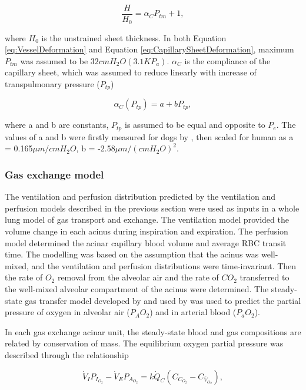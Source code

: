 \begin{equation}
 \label{eq:CapillarySheetDeformation}
 \frac{H}{H_0} = \alpha_C P_{tm} + 1,
\end{equation}

\noindent where $H_0$ is the unstrained sheet thickness. In both Equation \ref{eq:VesselDeformation} and Equation \ref{eq:CapillarySheetDeformation}, maximum $P_{tm}$ was assumed to be $32 cmH_2 O(3.1KP_a)$. $\alpha_C$ is the compliance of the capillary sheet, which was assumed to reduce linearly with increase of transpulmonary pressure ($P_{tp}$)

\begin{equation} 
 \label{eq:CapillaryCompliance}
 \alpha_C(P_{tp}) = a + bP_{tp},
\end{equation}

\noindent where a and b are constants, $P_{tp}$ is assumed to be equal and opposite to $P_e$. The values of a and b were firstly measured for dogs by \cite{glazier1969measurements}, then scaled for human as a = 0.165$\mu m/cmH_2O$, b = -2.58$\mu m/{(cmH_2O)}^2$.

\subsubsection{Gas exchange model}
The ventilation and perfusion distribution predicted by the ventilation and perfusion models described in the previous section were used as inputs in a whole lung model of gas transport and exchange. The ventilation model provided the volume change in each acinus during inspiration and expiration. The perfusion model determined the acinar capillary blood volume and average RBC transit time. The modelling was based on the assumption that the acinus was well-mixed, and the ventilation and perfusion distributions were time-invariant. Then the rate of $O_2$ removal from the alveolar air and the rate of $CO_2$ transferred to the well-mixed alveolar compartment of the acinus were determined. The steady-state gas transfer model developed by \cite{kapitan1986computer} and used by \cite{clark2014lack} was used to predict the partial pressure of oxygen in alveolar air ($P_AO_2$) and in arterial blood ($P_aO_2$).

In each gas exchange acinar unit, the steady-state blood and gas compositions are related by conservation of mass. The equilibrium oxygen partial pressure was described through the relationship

\begin{equation} 
 \label{eq:SteadyStateEquation}
 \dot{V}_I P_{I_{O_2}} - \dot{V}_E P_{A_{O_2}} = k\dot{Q}_C(C_{C_{O_2}} - C_{\bar{V}_{O_2}}),
\end{equation}

